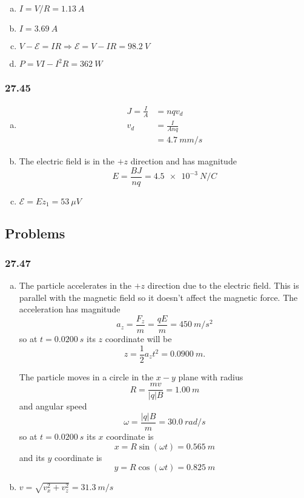 \documentclass{article}
\begin{document}
\begin{enumerate}[(a)]
  \item $I = V / R = \qty{1.13}{A}$

  \item $I = \qty{3.69}{A}$

  \item $V - \mathcal{E} = I R \Rightarrow \mathcal{E} = V - I R = \qty{98.2}{V}$

  \item $P = V I - I^2 R = \qty{362}{W}$
\end{enumerate}

\subsubsection{27.45}

\begin{enumerate}[(a)]
  \item

        \begin{align*}
          J = \frac{I}{A} & = n q v_d         \\
          v_d             & = \frac{I}{A n q} \\
                          & = \qty{4.7}{mm/s}
        \end{align*}

  \item The electric field is in the $+z$ direction and has magnitude \[E = \frac{B J}{n q} = \qty{4.5e-3}{N/C}\]

  \item $\mathcal{E} = E z_1 = \qty{53}{\mu V}$
\end{enumerate}

\subsection{Problems}

\subsubsection{27.47}

\begin{enumerate}[(a)]
  \item The particle accelerates in the $+z$ direction due to the electric field. This is parallel with the magnetic field so it doesn't affect the magnetic force. The acceleration has magnitude \[a_z = \frac{F_z}{m} = \frac{q E}{m} = \qty{450}{m/s^2}\] so at $t = \qty{0.0200}{s}$ its $z$ coordinate will be \[z = \frac{1}{2} a_z t^2 = \qty{0.0900}{m}.\]

        The particle moves in a circle in the $x-y$ plane with radius \[R = \frac{m v}{|q| B} = \qty{1.00}{m}\] and angular speed \[\omega = \frac{|q| B}{m} = \qty{30.0}{rad/s}\] so at $t = \qty{0.0200}{s}$ its $x$ coordinate is \[x = R \sin (\omega t) = \qty{0.565}{m}\] and its $y$ coordinate is \[y = R \cos (\omega t) = \qty{0.825}{m}\]

  \item $v = \sqrt{v_x^2 + v_z^2} = \qty{31.3}{m/s}$
\end{enumerate}
\end{document}
